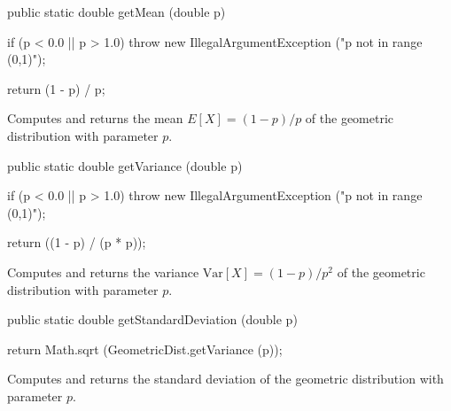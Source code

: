 \begin{htmlonly}
\end{htmlonly}
\begin{code}

   public static double getMean (double p)\begin{hide} {
      if (p < 0.0 || p > 1.0)
         throw new IllegalArgumentException ("p not in range (0,1)");

      return (1 - p) / p;
   }\end{hide}
\end{code}
\begin{tabb}  Computes and returns the mean  $E[X] = (1 - p)/p$ of the
   geometric distribution with parameter $p$.
\end{tabb}
\begin{htmlonly}
\end{htmlonly}
\begin{code}

   public static double getVariance (double p)\begin{hide} {
      if (p < 0.0 || p > 1.0)
         throw new IllegalArgumentException ("p not in range (0,1)");

      return ((1 - p) / (p * p));
   }\end{hide}
\end{code}
\begin{tabb}  Computes and returns the variance $\mbox{Var}[X] = (1 - p)/p^2$
   of the geometric distribution with parameter $p$.
\end{tabb}
\begin{htmlonly}
\end{htmlonly}
\begin{code}

   public static double getStandardDeviation (double p)\begin{hide} {
      return Math.sqrt (GeometricDist.getVariance (p));
   }\end{hide}
\end{code}
\begin{tabb}  Computes and returns the standard deviation of the geometric
   distribution with parameter $p$.
\end{tabb}
\begin{htmlonly}
\end{htmlonly}

